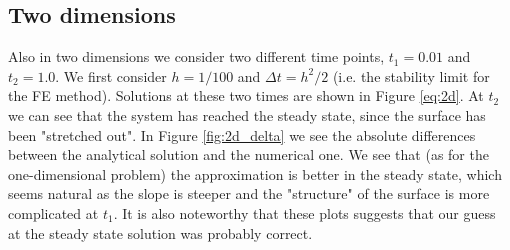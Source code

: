 \documentclass[12pt, a4paper]{article}
\begin{document}
\subsection{Two dimensions}

Also in two dimensions we consider two different time points, $t_1 = 0.01$ and $t_2 = 1.0$. We first 
consider $h=1/100$ and $\Delta t = h^2/2$ (i.e. the stability limit for the FE method). Solutions 
at these two times are shown in Figure \ref{eq:2d}. At $t_2$ we can see that the system has reached the 
steady state, since the surface has been "stretched out". In Figure \ref{fig:2d_delta} we see the 
absolute differences between the analytical solution and the numerical one. We see that (as for the 
one-dimensional problem) the approximation is better in the steady state, which seems natural as the 
slope is steeper and the "structure" of the surface is more complicated at $t_1$. It is also noteworthy 
that these plots suggests that our guess at the steady state solution was probably correct.       
\end{document}
